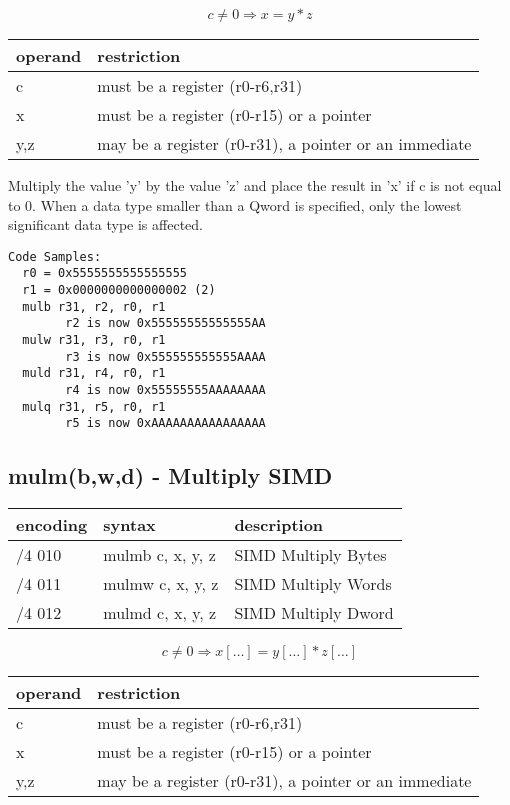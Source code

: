 \documentclass[letterpaper,10pt,openright,twoside,onecolumn]{book}
\begin{document}
  \begin{displaymath} c \neq 0 \Rightarrow x = y * z\end{displaymath}

  \flushleft
  \begin{tabular}{|l|l|}
   \hline
    operand & restriction \\
   \hline
    c & must be a register (r0-r6,r31) \\
    x & must be a register (r0-r15) or a pointer \\
    y,z & may be a register (r0-r31), a pointer or an immediate \\
   \hline
  \end{tabular}

  Multiply the value 'y' by the value 'z' and place the result in 'x'
  if c is not equal to 0.
  When a data type smaller than a Qword is specified, only the
  lowest significant data type is affected.

  \begin{verbatim}
Code Samples:
  r0 = 0x5555555555555555
  r1 = 0x0000000000000002 (2)
  mulb r31, r2, r0, r1
        r2 is now 0x55555555555555AA
  mulw r31, r3, r0, r1
        r3 is now 0x555555555555AAAA
  muld r31, r4, r0, r1
        r4 is now 0x55555555AAAAAAAA
  mulq r31, r5, r0, r1
        r5 is now 0xAAAAAAAAAAAAAAAA
  \end{verbatim}
\newpage\subsection{mulm(b,w,d) - Multiply SIMD}
  \begin{tabular}{|l|l|l|}
   \hline
    encoding & syntax & description \\
   \hline
    /4 010 & mulmb c, x, y, z & SIMD Multiply Bytes \\
    /4 011 & mulmw c, x, y, z & SIMD Multiply Words \\
    /4 012 & mulmd c, x, y, z & SIMD Multiply Dword \\
   \hline
  \end{tabular}

  \begin{displaymath} c \neq 0 \Rightarrow x[\ldots] = y[\ldots] * z[\ldots]\end{displaymath}

  \flushleft
  \begin{tabular}{|l|l|}
   \hline
    operand & restriction \\
   \hline
    c & must be a register (r0-r6,r31) \\
    x & must be a register (r0-r15) or a pointer \\
    y,z & may be a register (r0-r31), a pointer or an immediate \\
   \hline
  \end{tabular}
\end{document}
